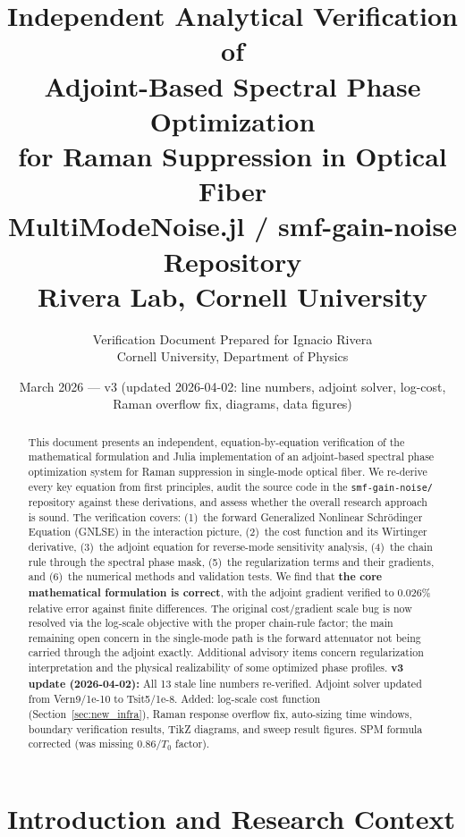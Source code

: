\documentclass[12pt,a4paper]{article}
\title{\textbf{Independent Analytical Verification of\\
Adjoint-Based Spectral Phase Optimization\\
for Raman Suppression in Optical Fiber}\\[12pt]
\large MultiModeNoise.jl / smf-gain-noise Repository\\
Rivera Lab, Cornell University}
\author{Verification Document Prepared for Ignacio Rivera\\
\small Cornell University, Department of Physics}
\date{March 2026 --- v3 (updated 2026-04-02: line numbers, adjoint solver, log-cost, Raman overflow fix, diagrams, data figures)}
\theoremstyle{definition}
\begin{document}
\maketitle
\thispagestyle{empty}

\begin{abstract}
This document presents an independent, equation-by-equation verification of the mathematical formulation and Julia implementation of an adjoint-based spectral phase optimization system for Raman suppression in single-mode optical fiber. We re-derive every key equation from first principles, audit the source code in the \texttt{smf-gain-noise/} repository against these derivations, and assess whether the overall research approach is sound. The verification covers: (1)~the forward Generalized Nonlinear Schr\"odinger Equation (GNLSE) in the interaction picture, (2)~the cost function and its Wirtinger derivative, (3)~the adjoint equation for reverse-mode sensitivity analysis, (4)~the chain rule through the spectral phase mask, (5)~the regularization terms and their gradients, and (6)~the numerical methods and validation tests. We find that \textbf{the core mathematical formulation is correct}, with the adjoint gradient verified to $0.026\%$ relative error against finite differences. The original cost/gradient scale bug is now resolved via the log-scale objective with the proper chain-rule factor; the main remaining open concern in the single-mode path is the forward attenuator not being carried through the adjoint exactly. Additional advisory items concern regularization interpretation and the physical realizability of some optimized phase profiles.
\medskip\noindent\textbf{v3 update (2026-04-02):} All 13 stale line numbers re-verified. Adjoint solver updated from Vern9/1e-10 to Tsit5/1e-8. Added: log-scale cost function (Section~\ref{sec:new_infra}), Raman response overflow fix, auto-sizing time windows, boundary verification results, TikZ diagrams, and sweep result figures. SPM formula corrected (was missing 0.86/$T_0$ factor).
\end{abstract}

\tableofcontents
\newpage

\section{Introduction and Research Context}
\label{sec:intro}

\end{document}
